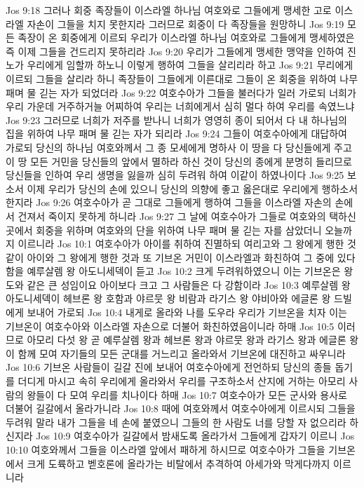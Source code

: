 Jos 9:18  그러나 회중 족장들이 이스라엘 하나님 여호와로 그들에게 맹세한 고로 이스라엘 자손이 그들을 치지 못한지라 그러므로 회중이 다 족장들을 원망하니
Jos 9:19  모든 족장이 온 회중에게 이르되 우리가 이스라엘 하나님 여호와로 그들에게 맹세하였은즉 이제 그들을 건드리지 못하리라
Jos 9:20  우리가 그들에게 맹세한 맹약을 인하여 진노가 우리에게 임할까 하노니 이렇게 행하여 그들을 살리리라 하고
Jos 9:21  무리에게 이르되 그들을 살리라 하니 족장들이 그들에게 이른대로 그들이 온 회중을 위하여 나무 패며 물 긷는 자가 되었더라
Jos 9:22  여호수아가 그들을 불러다가 일러 가로되 너희가 우리 가운데 거주하거늘 어찌하여 우리는 너희에게서 심히 멀다 하여 우리를 속였느냐
Jos 9:23  그러므로 너희가 저주를 받나니 너희가 영영히 종이 되어서 다 내 하나님의 집을 위하여 나무 패며 물 긷는 자가 되리라
Jos 9:24  그들이 여호수아에게 대답하여 가로되 당신의 하나님 여호와께서 그 종 모세에게 명하사 이 땅을 다 당신들에게 주고 이 땅 모든 거민을 당신들의 앞에서 멸하라 하신 것이 당신의 종에게 분명히 들리므로 당신들을 인하여 우리 생명을 잃을까 심히 두려워 하여 이같이 하였나이다
Jos 9:25  보소서 이제 우리가 당신의 손에 있으니 당신의 의향에 좋고 옳은대로 우리에게 행하소서 한지라
Jos 9:26  여호수아가 곧 그대로 그들에게 행하여 그들을 이스라엘 자손의 손에서 건져서 죽이지 못하게 하니라
Jos 9:27  그 날에 여호수아가 그들로 여호와의 택하신 곳에서 회중을 위하며 여호와의 단을 위하여 나무 패며 물 긷는 자를 삼았더니 오늘까지 이르니라
Jos 10:1  여호수아가 아이를 취하여 진멸하되 여리고와 그 왕에게 행한 것같이 아이와 그 왕에게 행한 것과 또 기브온 거민이 이스라엘과 화친하여 그 중에 있다함을 예루살렘 왕 아도니세덱이 듣고
Jos 10:2  크게 두려워하였으니 이는 기브온은 왕도와 같은 큰 성임이요 아이보다 크고 그 사람들은 다 강함이라
Jos 10:3  예루살렘 왕 아도니세덱이 헤브론 왕 호함과 야르뭇 왕 비람과 라기스 왕 야비아와 에글론 왕 드빌에게 보내어 가로되
Jos 10:4  내게로 올라와 나를 도우라 우리가 기브온을 치자 이는 기브온이 여호수아와 이스라엘 자손으로 더불어 화친하였음이니라 하매
Jos 10:5  이러므로 아모리 다섯 왕 곧 예루살렘 왕과 헤브론 왕과 야르뭇 왕과 라기스 왕과 에글론 왕이 함께 모여 자기들의 모든 군대를 거느리고 올라와서 기브온에 대진하고 싸우니라
Jos 10:6  기브온 사람들이 길갈 진에 보내어 여호수아에게 전언하되 당신의 종들 돕기를 더디게 마시고 속히 우리에게 올라와서 우리를 구조하소서 산지에 거하는 아모리 사람의 왕들이 다 모여 우리를 치나이다 하매
Jos 10:7  여호수아가 모든 군사와 용사로 더불어 길갈에서 올라가니라
Jos 10:8  때에 여호와께서 여호수아에게 이르시되 그들을 두려워 말라 내가 그들을 네 손에 붙였으니 그들의 한 사람도 너를 당할 자 없으리라 하신지라
Jos 10:9  여호수아가 길갈에서 밤새도록 올라가서 그들에게 갑자기 이르니
Jos 10:10  여호와께서 그들을 이스라엘 앞에서 패하게 하시므로 여호수아가 그들을 기브온에서 크게 도륙하고 벧호론에 올라가는 비탈에서 추격하여 아세가와 막게다까지 이르니라
